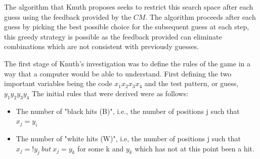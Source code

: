 \documentclass[12pt]{article}  %
\theoremstyle{definition}
\theoremstyle{remark}
\begin{document}
\par The algorithm that Knuth proposes seeks to restrict this search space after each guess using the feedback provided by the $CM$. The algorithm proceeds after each guess by picking the best possible choice for the subsequent guess at each step, this greedy strategy \cite {Wolfram} is possible as the feedback provided can eliminate combinations which are not consistent with previously guesses. 

\par The first stage of Knuth's investigation was to define the rules of the game in a way that a computer would be able to understand. First defining the two important variables being the code $x_1 x_2 x_3 x_4$ and the test pattern, or guess, $y_1 y_2 y_3 y_4$ The initial rules that were derived were as follows:
\begin {itemize}
	\item {The number of "black hits (B)", i.e., the number of positions j such that $x_j = y_i$}
	\item {The number of "white hits (W)", i.e, the number of positions j such that $x_j =! y_j \  but \ x_j = y_k$ for some k and $y_k$ which has not at this point been a hit.} \cite {Knuth}
\end {itemize}
\end{document}
